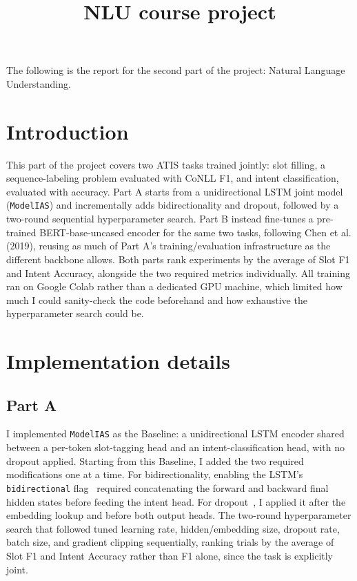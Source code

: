 \documentclass[a4paper]{article}
\title{NLU course project}
\begin{document}
\maketitle

The following is the report for the second part of the project: Natural Language Understanding.

\section{Introduction}

This part of the project covers two ATIS tasks trained jointly: slot filling, a sequence-labeling problem evaluated with CoNLL F1, and intent classification, evaluated with accuracy. Part A starts from a unidirectional LSTM joint model (\texttt{ModelIAS}) and incrementally adds bidirectionality and dropout, followed by a two-round sequential hyperparameter search. Part B instead fine-tunes a pre-trained BERT-base-uncased encoder for the same two tasks, following Chen et al. (2019), reusing as much of Part A's training/evaluation infrastructure as the different backbone allows. Both parts rank experiments by the average of Slot F1 and Intent Accuracy, alongside the two required metrics individually. All training ran on Google Colab rather than a dedicated GPU machine, which limited how much I could sanity-check the code beforehand and how exhaustive the hyperparameter search could be.

\section{Implementation details}

\subsection{Part A}

I implemented \texttt{ModelIAS} as the Baseline: a unidirectional LSTM encoder shared between a per-token slot-tagging head and an intent-classification head, with no dropout applied. Starting from this Baseline, I added the two required modifications one at a time. For bidirectionality, enabling the LSTM's \texttt{bidirectional} flag~\cite{lstm_docs} required concatenating the forward and backward final hidden states before feeding the intent head. For dropout~\cite{dropout_docs}, I applied it after the embedding lookup and before both output heads. The two-round hyperparameter search that followed tuned learning rate, hidden/embedding size, dropout rate, batch size, and gradient clipping sequentially, ranking trials by the average of Slot F1 and Intent Accuracy rather than F1 alone, since the task is explicitly joint.
\end{document}
